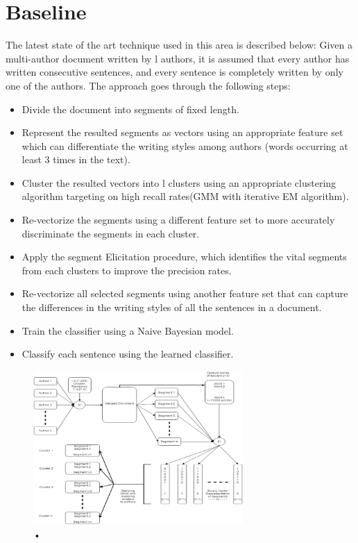 \documentclass[letterpaper]{article}
\begin{document}
\section{Baseline}
The latest state of the art technique used in this area is described below:
Given a multi-author document written by l authors, it is assumed that every author has written consecutive sentences, and every sentence is completely written by only one of the authors. The approach goes through the following steps:
\begin{itemize}
\item Divide the document into segments of fixed length.
\item Represent the resulted segments as vectors using an appropriate feature set which can differentiate the writing styles among authors (words occurring at least 3 times in the text).
\item Cluster the resulted vectors into l clusters using an appropriate clustering algorithm targeting on high recall rates(GMM with iterative EM algorithm).
\item Re-vectorize the segments using a different feature set to more accurately discriminate the segments in each cluster.
\item Apply the segment Elicitation procedure, which identifies the vital segments from each clusters to improve the precision rates.
\item Re-vectorize all selected segments using another feature set that can capture the differences in the writing styles of all the sentences in a document.
\item Train the classifier using a Naive Bayesian model.
\item Classify each sentence using the learned classifier.
\end{itemize}
\begin{figure}
\caption{•}
\includegraphics[width=8cm]{u7.jpg}
\centering
\end{figure}
\end{document}
